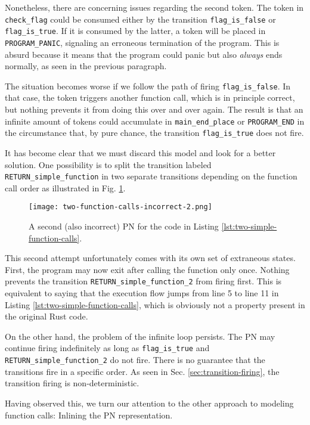\documentclass[../Thesis.tex]{subfiles}
\begin{document}
Nonetheless, there are concerning issues regarding the second token.
The token in \texttt{check\_flag} could be consumed either
by the transition \texttt{flag\_is\_false} or \texttt{flag\_is\_true}.
If it is consumed by the latter, a token will be placed in \texttt{PROGRAM\_PANIC},
signaling an erroneous termination of the program.
This is absurd because it means that the program could panic
but also \emph{always} ends normally, as seen in the previous paragraph.

The situation becomes worse if we follow the path of firing \texttt{flag\_is\_false}.
In that case, the token triggers another function call, which is in principle correct,
but nothing prevents it from doing this over and over again.
The result is that an infinite amount of tokens could accumulate
in \texttt{main\_end\_place} or \texttt{PROGRAM\_END}
in the circumstance that, by pure chance,
the transition \texttt{flag\_is\_true} does not fire.

It has become clear that we must discard this model and look for a better solution.
One possibility is to split the transition labeled \texttt{RETURN\_simple\_function}
in two separate transitions depending on the function call order
as illustrated in Fig. \ref{fig:two-function-calls-incorrect-2}.

\begin{figure}[!htb]
    \centering
    \texttt{[image: two-function-calls-incorrect-2.png]}
    \caption{A second (also incorrect) \acrshort{PN} for the code
        in Listing \ref{lst:two-simple-function-calls}.}
    \label{fig:two-function-calls-incorrect-2}
\end{figure}

This second attempt unfortunately comes with its own set of extraneous states.
First, the program may now exit after calling the function only once.
Nothing prevents the transition \texttt{RETURN\_simple\_function\_2} from firing first.
This is equivalent to saying that the execution flow jumps
from line 5 to line 11 in Listing \ref{lst:two-simple-function-calls},
which is obviously not a property present in the original Rust code.

On the other hand, the problem of the infinite loop persists.
The \acrshort{PN} may continue firing indefinitely as long as
\texttt{flag\_is\_true} and \texttt{RETURN\_simple\_function\_2} do not fire.
There is no guarantee that the transitions fire in a specific order.
As seen in Sec. \ref{sec:transition-firing},
the transition firing is non-deterministic.

Having observed this, we turn our attention to the other approach to modeling
function calls: Inlining the \acrshort{PN} representation.
\end{document}
